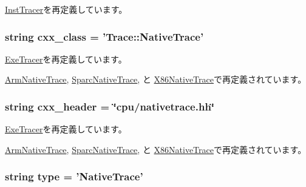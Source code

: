 \hyperlink{classInstTracer_1_1InstTracer_a17fa61ac3806b481cafee5593b55e5d0}{InstTracer}を再定義しています。\hypertarget{classNativeTrace_1_1NativeTrace_a58cd55cd4023648e138237cfc0822ae3}{
\subsubsection[{cxx\_\-class}]{\setlength{\rightskip}{0pt plus 5cm}string {\bf cxx\_\-class} = '{\bf Trace::NativeTrace}'}}
\label{classNativeTrace_1_1NativeTrace_a58cd55cd4023648e138237cfc0822ae3}


\hyperlink{classExeTracer_1_1ExeTracer_a58cd55cd4023648e138237cfc0822ae3}{ExeTracer}を再定義しています。

\hyperlink{classArmNativeTrace_1_1ArmNativeTrace_a58cd55cd4023648e138237cfc0822ae3}{ArmNativeTrace}, \hyperlink{classSparcNativeTrace_1_1SparcNativeTrace_a58cd55cd4023648e138237cfc0822ae3}{SparcNativeTrace}, と \hyperlink{classX86NativeTrace_1_1X86NativeTrace_a58cd55cd4023648e138237cfc0822ae3}{X86NativeTrace}で再定義されています。\hypertarget{classNativeTrace_1_1NativeTrace_a17da7064bc5c518791f0c891eff05fda}{
\subsubsection[{cxx\_\-header}]{\setlength{\rightskip}{0pt plus 5cm}string {\bf cxx\_\-header} = \char`\"{}cpu/nativetrace.hh\char`\"{}}}
\label{classNativeTrace_1_1NativeTrace_a17da7064bc5c518791f0c891eff05fda}


\hyperlink{classExeTracer_1_1ExeTracer_a17da7064bc5c518791f0c891eff05fda}{ExeTracer}を再定義しています。

\hyperlink{classArmNativeTrace_1_1ArmNativeTrace_a17da7064bc5c518791f0c891eff05fda}{ArmNativeTrace}, \hyperlink{classSparcNativeTrace_1_1SparcNativeTrace_a17da7064bc5c518791f0c891eff05fda}{SparcNativeTrace}, と \hyperlink{classX86NativeTrace_1_1X86NativeTrace_a17da7064bc5c518791f0c891eff05fda}{X86NativeTrace}で再定義されています。\hypertarget{classNativeTrace_1_1NativeTrace_acce15679d830831b0bbe8ebc2a60b2ca}{
\subsubsection[{type}]{\setlength{\rightskip}{0pt plus 5cm}string {\bf type} = '{\bf NativeTrace}'}}
\label{classNativeTrace_1_1NativeTrace_acce15679d830831b0bbe8ebc2a60b2ca}


